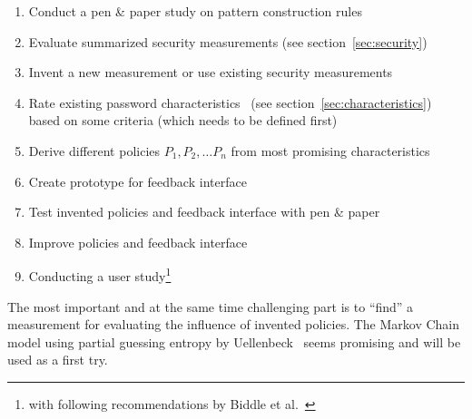 \documentclass[twocolumn, a4paper, 10pt]{article}
\begin{document}
\begin{enumerate}
	\item Conduct a pen \& paper study on pattern construction rules
	\item Evaluate summarized security measurements (see section~\ref{sec:security})
	\item Invent a new measurement or use existing security measurements
	\item Rate existing password characteristics~ (see section~\ref{sec:characteristics}) based on some criteria (which needs to be defined first)
	\item Derive different policies $P_1, P_2, \dots P_n$ from most promising characteristics
	\item Create prototype for feedback interface
	\item Test invented policies and feedback interface with pen \& paper
	\item Improve policies and feedback interface
	\item Conducting a user study\footnote{with following recommendations by Biddle et al.~\cite{Biddle:2012:GPL:2333112.2333114}}
\end{enumerate}

The most important and at the same time challenging part is to ``find'' a measurement for evaluating the influence of invented policies. The Markov Chain model using partial guessing entropy by Uellenbeck~\cite{Uellenbeck:2013:QSG:2508859.2516700} seems promising and will be used as a first try.

{
	
	
}

\appendix
\end{document}
